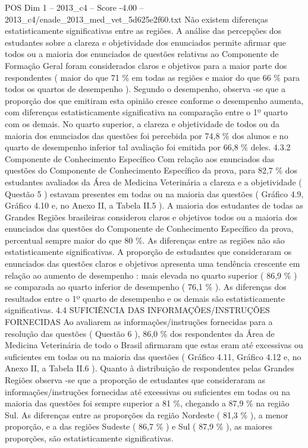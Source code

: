 \begin{textsample}{POS Dim 1 – 2013\_c4 – Score -4.00 – 2013\_c4/enade\_2013\_med\_vet\_5d625e2f60.txt}
Não existem diferenças estatisticamente significativas entre as regiões.
A análise das percepções dos estudantes sobre a clareza e objetividade dos enunciados permite afirmar que todos ou a maioria dos enunciados de questões relativas ao Componente de Formação Geral foram considerados claros e objetivos para a maior parte dos respondentes ( maior do que 71 \% em todas as regiões e maior do que 66 \% para todos os quartos de desempenho ).
Segundo o desempenho, observa -se que a proporção dos que emitiram esta opinião cresce conforme o desempenho aumenta, com diferenças estatisticamente significativa na comparação entre o 1º quarto com os demais.
No quarto superior, a clareza e objetividade de todos ou da maioria dos enunciados das questões foi percebida por 74,8 \% dos alunos e no quarto de desempenho inferior tal avaliação foi emitida por 66,8 \% deles. 4.3.2 Componente de Conhecimento Específico Com relação aos enunciados das questões do Componente de Conhecimento Específico da prova, para 82,7 \% dos estudantes avaliados da Área de Medicina Veterinária a clareza e a objetividade ( Questão 5 ) estavam presentes em todas ou na maioria das questões ( Gráfico 4.9, Gráfico 4.10 e, no Anexo II, a Tabela II.5 ).
A maioria dos estudantes de todas as Grandes Regiões brasileiras considerou claros e objetivos todos ou a maioria dos enunciados das questões do Componente de Conhecimento Específico da prova, percentual sempre maior do que 80 \%.
As diferenças entre as regiões não são estatisticamente significativas.
A proporção de estudantes que consideraram os enunciados das questões claros e objetivos apresenta uma tendência crescente em relação ao aumento de desempenho : mais elevada no quarto superior ( 86,9 \% ) se comparada ao quarto inferior de desempenho ( 76,1 \% ).
As diferenças dos resultados entre o 1º quarto de desempenho e os demais são estatisticamente significativas. 4.4 SUFICIÊNCIA DAS INFORMAÇÕES/INSTRUÇÕES FORNECIDAS Ao avaliarem as informações/instruções fornecidas para a resolução das questões ( Questão 6 ), 86,0 \% dos respondentes da Área de Medicina Veterinária de todo o Brasil afirmaram que estas eram até excessivas ou suficientes em todas ou na maioria das questões ( Gráfico 4.11, Gráfico 4.12 e, no Anexo II, a Tabela II.6 ).
Quanto à distribuição de respondentes pelas Grandes Regiões observa -se que a proporção de estudantes que consideraram as informações/instruções fornecidas até excessivas ou suficientes em todas ou na maioria das questões foi sempre superior a 81 \%, chegando a 87,9 \% na região Sul.
As diferenças entre as proporções da região Nordeste ( 81,3 \% ), a menor proporção, e a das regiões Sudeste ( 86,7 \% ) e Sul ( 87,9 \% ), as maiores proporções, são estatisticamente significativas.

\end{textsample}
